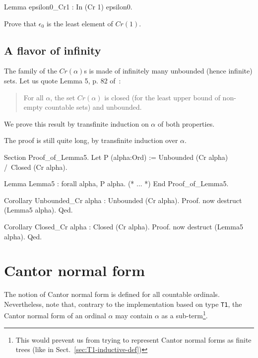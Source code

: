 \documentclass[a4paper]{book}
\begin{document}
{\begin{Coqsrc}
Lemma epsilon0_Cr1 : In (Cr 1) epsilon0.
\end{Coqsrc}


\begin{exercise}
 Prove that $\epsilon_0$ is the least element of $\textit{Cr}(1)$.
\end{exercise}


\subsection{A flavor of infinity}



The family of the $\textit{Cr}(\alpha)$s is made of infinitely many unbounded (hence infinite) sets.
Let us quote Lemma 5, p. 82  of~\cite{schutte}:
\begin{quote}
  For all $\alpha$, the set $\textit{Cr}(\alpha)$ is closed (for the least upper bound of non-empty countable sets) and unbounded.
\end{quote}

We prove this result by transfinite induction on $\alpha$ of both properties.

The proof is still quite long, by transfinite induction over $\alpha$.


\begin{Coqsrc}
Section Proof_of_Lemma5.
  Let P (alpha:Ord) := Unbounded (Cr alpha) /\ Closed (Cr alpha).
 
 Lemma Lemma5 : forall alpha, P alpha.
(* ... *)
 End Proof_of_Lemma5.

Corollary Unbounded_Cr alpha : Unbounded (Cr alpha).
Proof.
  now destruct (Lemma5 alpha).
Qed.

Corollary Closed_Cr alpha : Closed (Cr alpha).
Proof.
  now destruct (Lemma5 alpha).
Qed.
\end{Coqsrc}

\section{Cantor normal form}

The notion of Cantor normal form is defined for all countable ordinals.
Nevertheless, note that, contrary to the implementation based on type \texttt{T1},
the Cantor normal form of an ordinal $\alpha$ may contain $\alpha$ as a 
sub-term\footnote{This would prevent us from trying to represent Cantor normal forms as finite trees (like in Sect.~\ref{sec:T1-inductive-def})}.


}
\end{document}
